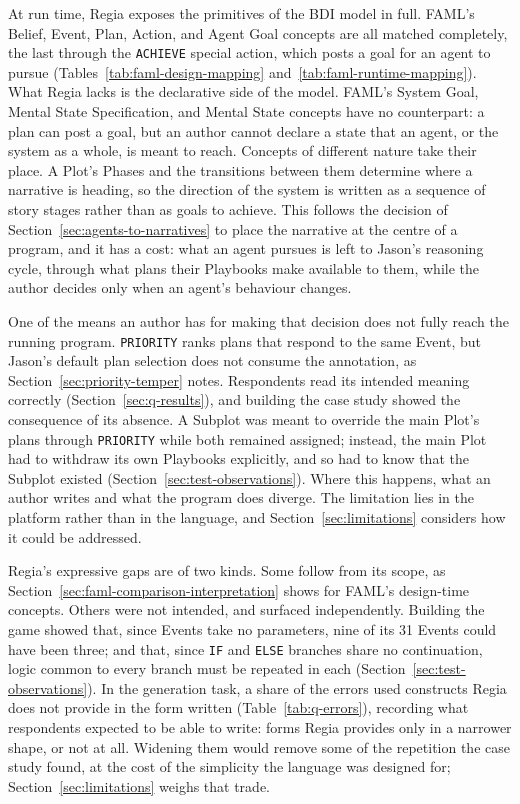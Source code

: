 At run time, Regia exposes the primitives of the BDI model in full. FAML's Belief, Event, Plan, Action, and Agent Goal concepts are all matched completely, the last through the \lstinline|ACHIEVE| special action, which posts a goal for an agent to pursue (Tables~\ref{tab:faml-design-mapping} and~\ref{tab:faml-runtime-mapping}). What Regia lacks is the declarative side of the model. FAML's System Goal, Mental State Specification, and Mental State concepts have no counterpart: a plan can post a goal, but an author cannot declare a state that an agent, or the system as a whole, is meant to reach. Concepts of different nature take their place. A Plot's Phases and the transitions between them determine where a narrative is heading, so the direction of the system is written as a sequence of story stages rather than as goals to achieve. This follows the decision of Section~\ref{sec:agents-to-narratives} to place the narrative at the centre of a program, and it has a cost: what an agent pursues is left to Jason's reasoning cycle, through what plans their Playbooks make available to them, while the author decides only when an agent's behaviour changes.
 
One of the means an author has for making that decision does not fully reach the running program. \lstinline|PRIORITY| ranks plans that respond to the same Event, but Jason's default plan selection does not consume the annotation, as Section~\ref{sec:priority-temper} notes. Respondents read its intended meaning correctly (Section~\ref{sec:q-results}), and building the case study showed the consequence of its absence. A Subplot was meant to override the main Plot's plans through \lstinline|PRIORITY| while both remained assigned; instead, the main Plot had to withdraw its own Playbooks explicitly, and so had to know that the Subplot existed (Section~\ref{sec:test-observations}). Where this happens, what an author writes and what the program does diverge. The limitation lies in the platform rather than in the language, and Section~\ref{sec:limitations} considers how it could be addressed.
 
Regia's expressive gaps are of two kinds. Some follow from its scope, as Section~\ref{sec:faml-comparison-interpretation} shows for FAML's design-time concepts. Others were not intended, and surfaced independently. Building the game showed that, since Events take no parameters, nine of its 31 Events could have been three; and that, since \lstinline|IF| and \lstinline|ELSE| branches share no continuation, logic common to every branch must be repeated in each (Section~\ref{sec:test-observations}). In the generation task, a share of the errors used constructs Regia does not provide in the form written (Table~\ref{tab:q-errors}), recording what respondents expected to be able to write: forms Regia provides only in a narrower shape, or not at all. Widening them would remove some of the repetition the case study found, at the cost of the simplicity the language was designed for; Section~\ref{sec:limitations} weighs that trade.

